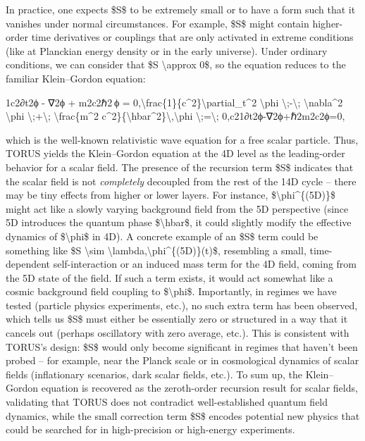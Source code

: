 \documentclass[
]{article}
\begin{document}
In practice, one expects \$S\$ to be extremely small or to have a form
such that it vanishes under normal circumstances. For example, \$S\$
might contain higher-order time derivatives or couplings that are only
activated in extreme conditions (like at Planckian energy density or in
the early universe). Under ordinary conditions, we can consider that \$S
\textbackslash approx 0\$, so the equation reduces to the familiar
Klein--Gordon equation:

1c2∂t2ϕ  -  ∇2ϕ  +  m2c2ℏ2 ϕ  =  0,\textbackslash frac\{1\}\{c\^{}2\}\textbackslash partial\_t\^{}2
\textbackslash phi \textbackslash;-\textbackslash;
\textbackslash nabla\^{}2 \textbackslash phi
\textbackslash;+\textbackslash; \textbackslash frac\{m\^{}2
c\^{}2\}\{\textbackslash hbar\^{}2\}\textbackslash,\textbackslash phi
\textbackslash;=\textbackslash;
0,c21\hspace{0pt}∂t2\hspace{0pt}ϕ-∇2ϕ+ℏ2m2c2\hspace{0pt}ϕ=0,

which is the well-known relativistic wave equation for a free scalar
particle. Thus, TORUS yields the Klein--Gordon equation at the 4D level
as the leading-order behavior for a scalar field. The presence of the
recursion term \$S\$ indicates that the scalar field is not
\emph{completely} decoupled from the rest of the 14D cycle -- there may
be tiny effects from higher or lower layers. For instance,
\$\textbackslash phi\^{}\{(5D)\}\$ might act like a slowly varying
background field from the 5D perspective (since 5D introduces the
quantum phase \$\textbackslash hbar\$, it could slightly modify the
effective dynamics of \$\textbackslash phi\$ in 4D). A concrete example
of an \$S\$ term could be something like \$S \textbackslash sim
\textbackslash lambda,\textbackslash phi\^{}\{(5D)\}(t)\$, resembling a
small, time-dependent self-interaction or an induced mass term for the
4D field, coming from the 5D state of the field. If such a term exists,
it would act somewhat like a cosmic background field coupling to
\$\textbackslash phi\$. Importantly, in regimes we have tested (particle
physics experiments, etc.), no such extra term has been observed, which
tells us \$S\$ must either be essentially zero or structured in a way
that it cancels out (perhaps oscillatory with zero average, etc.). This
is consistent with TORUS's design: \$S\$ would only become significant
in regimes that haven't been probed -- for example, near the Planck
scale or in cosmological dynamics of scalar fields (inflationary
scenarios, dark scalar fields, etc.). To sum up, the Klein--Gordon
equation is recovered as the zeroth-order recursion result for scalar
fields, validating that TORUS does not contradict well-established
quantum field dynamics, while the small correction term \$S\$ encodes
potential new physics that could be searched for in high-precision or
high-energy experiments.
\end{document}
